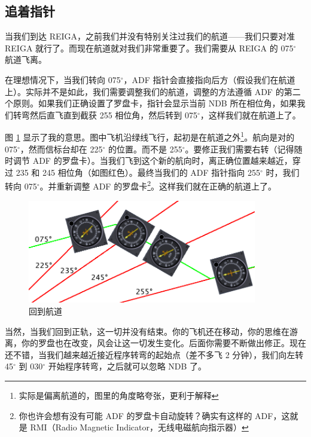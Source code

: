 \subsection{追着指针}

当我们到达 REIGA，之前我们并没有特别关注过我们的航道——我们只要对准 REIGA 就行了。而现在航道就对我们非常重要了。我们需要从 REIGA 的 075$^\circ$ 航道飞离。

在理想情况下，当我们转向 075$^\circ$，ADF 指针会直接指向后方（假设我们在航道上）。实际并不是如此，我们需要调整我们的航道，调整的方法遵循 ADF 的第二个原则。如果我们正确设置了罗盘卡，指针会显示当前 NDB 所在相位角，如果我们转弯然后直飞直到截获 255 相位角，然后转到 075$^\circ$，这样我们就在航道上了。

图 \ref{fig:NDB_flying} 显示了我的意思。图中飞机沿绿线飞行，起初是在航道之外\footnote{实际是偏离航道的，图里的角度略夸张，更利于解释}。航向是对的 075$^\circ$，然而信标台却在 225$^\circ$ 的位置。而不是 255$^\circ$。要修正我们需要右转（记得随时调节 ADF 的罗盘卡）。当我们飞到这个新的航向时，离正确位置越来越近，穿过 235 和 245 相位角（如图红色）。最终当我们的 ADF 指针指向 255$^\circ$ 时，我们转向 075$^\circ$。并重新调整 ADF 的罗盘卡\footnote{你也许会想有没有可能 ADF 的罗盘卡自动旋转？确实有这样的 ADF，这就是 RMI（Radio Magnetic Indicator，无线电磁航向指示器）}。这样我们就在正确的航道上了。

\begin{figure}
  \begin{center}
    \includegraphics[width=10cm]{img/NDB_flying}
    \caption{回到航道}
    \label{fig:NDB_flying}
  \end{center}
\end{figure}

当然，当我们回到正轨，这一切并没有结束。你的飞机还在移动，你的思维在游离，你的罗盘也在改变，风会让这一切发生变化。后面你需要不断做出修正。现在还不错，当我们越来越近接近程序转弯的起始点（差不多飞 2 分钟），我们向左转 45$^\circ$ 到  030$^\circ$ 开始程序转弯，之后就可以忽略 NDB 了。


